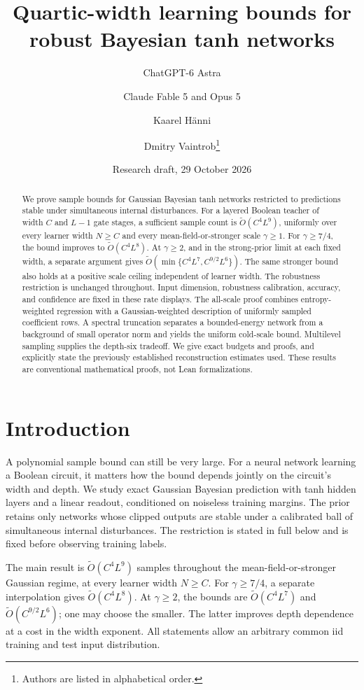 \documentclass[11pt]{article}
\title{Quartic-width learning bounds for robust Bayesian tanh networks}
\author{ChatGPT-6 Astra \and Claude Fable 5 and Opus 5 \and Kaarel H\"anni \and Dmitry Vaintrob\thanks{Authors are listed in alphabetical order.}}
\date{Research draft, 29 October 2026}
\begin{document}
\maketitle
\begin{abstract}
We prove sample bounds for Gaussian Bayesian tanh networks restricted to
predictions stable under simultaneous internal disturbances. For a layered
Boolean teacher of width $C$ and $L-1$ gate stages, a sufficient sample
count is $\widetilde O(C^4L^9)$, uniformly over every learner width
$N\ge C$ and every mean-field-or-stronger scale $\gamma\ge1$.
For $\gamma\ge7/4$, the bound improves to $\widetilde O(C^4L^8)$.
At $\gamma\ge2$, and in the strong-prior limit at each fixed width,
a separate argument gives
$\widetilde O(\min\{C^4L^7,C^{9/2}L^6\})$. The same stronger bound
also holds at a positive scale ceiling independent of learner width.
The robustness restriction is unchanged throughout. Input dimension,
robustness calibration, accuracy, and confidence are fixed in these
rate displays. The all-scale proof combines entropy-weighted regression
with a Gaussian-weighted description of uniformly sampled coefficient
rows. A spectral truncation separates a bounded-energy network from a
background of small operator norm and yields the uniform cold-scale
bound. Multilevel sampling supplies the depth-six tradeoff.
We give exact budgets and proofs, and explicitly state the previously
established reconstruction estimates used. These results are conventional
mathematical proofs, not Lean formalizations.
\end{abstract}

\section{Introduction}

A polynomial sample bound can still be very large. For a neural network
learning a Boolean circuit, it matters how the bound depends jointly on
the circuit's width and depth. We study exact Gaussian Bayesian prediction
with tanh hidden layers and a linear readout, conditioned on noiseless
training margins. The prior retains only networks whose clipped outputs
are stable under a calibrated ball of simultaneous internal disturbances.
The restriction is stated in full below and is fixed before observing
training labels.

The main result is $\widetilde O(C^4L^9)$ samples throughout the
mean-field-or-stronger Gaussian regime, at every learner width $N\ge C$.
For $\gamma\ge7/4$, a separate interpolation gives
$\widetilde O(C^4L^8)$. At $\gamma\ge2$, the bounds are
$\widetilde O(C^4L^7)$ and $\widetilde O(C^{9/2}L^6)$; one may choose
the smaller. The latter improves depth dependence at a cost in the
width exponent. All statements allow an arbitrary common iid training
and test input distribution.
\end{document}
